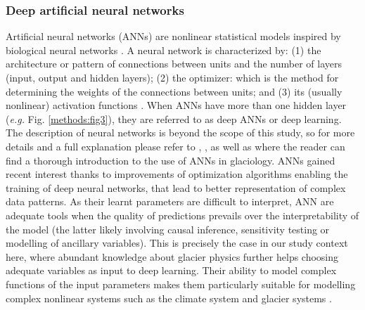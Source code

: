 \subsubsection{Deep artificial neural networks} \label{methods:methods:ann}

Artificial neural networks (ANNs) are nonlinear statistical models inspired by biological neural networks \citep{fausett_fundamentals_1994, hastie_elements_2009}. A neural network is characterized by: (1) the architecture or pattern of connections between units and the number of layers (input, output and hidden layers); (2) the optimizer: which is the method for determining the weights of the connections between units; and (3) its (usually nonlinear) activation functions \citep{fausett_fundamentals_1994}. When ANNs have more than one hidden layer (\textit{e.g.} Fig. \ref{methods:fig3}), they are referred to as deep ANNs or deep learning. The description of neural networks is beyond the scope of this study, so for more details and a full explanation please refer to \citet{fausett_fundamentals_1994}, \citet{hastie_elements_2009}, as well as \citet{steiner_application_2005, steiner_sensitivity_2008} where the reader can find a thorough introduction to the use of ANNs in glaciology. ANNs gained recent interest thanks to improvements of optimization algorithms enabling the training of deep neural networks, that lead to better representation of complex data patterns. As their learnt parameters are difficult to interpret, ANN are adequate tools when the quality of predictions prevails over the interpretability of the model (the latter likely involving causal inference, sensitivity testing or modelling of ancillary variables). This is precisely the case in our study context here, where abundant knowledge about glacier physics further helps choosing adequate variables as input to deep learning. Their ability to model complex functions of the input parameters makes them particularly suitable for modelling complex nonlinear systems such as the climate system \citep{houghton_climate_2001} and glacier systems \citep{steiner_application_2005}.

